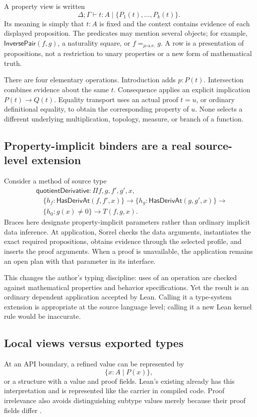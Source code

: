 \documentclass[11pt,a4paper]{article}
\newcommand{\code}[1]{\texttt{\detokenize{#1}}}
\numberwithin{equation}{section}
\theoremstyle{definition}\newtheorem{definition}[theorem]{Definition}
\theoremstyle{remark}\newtheorem{remark}[theorem]{Remark}
\begin{document}
A property view is written
\[
 \Delta;\Gamma\vdash t:A\mid\{P_1(t),\ldots,P_k(t)\}.
\]
Its meaning is simply that \(t:A\) is fixed and the context contains evidence
of each displayed proposition. The predicates may mention several objects;
for example, \(\mathsf{InversePair}(f,g)\), a naturality square, or
\(f=_{\mu\text{-a.e.}}g\). A row is a presentation of propositions, not a
restriction to unary properties or a new form of mathematical truth.

There are four elementary operations. Introduction adds \(p:P(t)\).
Intersection combines evidence about the same \(t\). Consequence applies an
explicit implication \(P(t)\to Q(t)\). Equality transport uses an actual proof
\(t=u\), or ordinary definitional equality, to obtain the corresponding
property of \(u\). None selects a different underlying multiplication,
topology, measure, or branch of a function.

\subsection{Property-implicit binders are a real source-level extension}
Consider a method of source type
\[
 \begin{aligned}
 &\mathsf{quotientDerivative}:\Pi f,g,f',g',x,\\
 &\quad \{h_f:\mathsf{HasDerivAt}(f,f',x)\}\to
 \{h_g:\mathsf{HasDerivAt}(g,g',x)\}\to\\
 &\quad \{h_0:g(x)\ne0\}\to T(f,g,x).
 \end{aligned}
\]
Braces here designate property-implicit parameters rather than ordinary
implicit data inference. At application, Sorrel checks the data arguments,
instantiates the exact required propositions, obtains evidence through the
selected profile, and inserts the proof arguments. When a proof is unavailable,
the application remains an open plan with that parameter in its interface.

This changes the author's typing discipline: uses of an operation are checked
against mathematical properties and behavior specifications. Yet the result
is an ordinary dependent application accepted by Lean. Calling it a type-system
extension is appropriate at the source language level; calling it a new Lean
kernel rule would be inaccurate.

\subsection{Local views versus exported types}
At an API boundary, a refined value can be represented by
\[
 \{x:A\mid P(x)\},
\]
or a structure with a value and proof fields. Lean's existing \code{Subtype}
already has this interpretation and is represented like the carrier in
compiled code. Proof irrelevance also avoids distinguishing subtype values
merely because their proof fields differ \cite{leanSubtype}.
\end{document}
